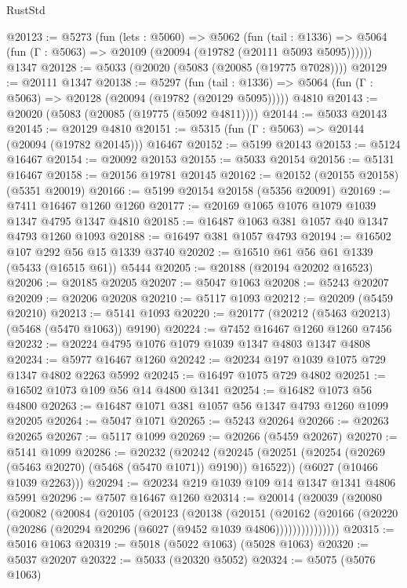 \begin{lexlean}{RustStd}
\begin{coremodule}
@20123 := @5273
    (fun (lets : @5060) =>
    @5062
      (fun (tail : @1336) =>
      @5064 (fun (Γ : @5063) => @20109 (@20094 (@19782 (@20111 @5093 @5095))))))
    @1347
@20128 := @5033 (@20020 (@5083 (@20085 (@19775 @7028))))
@20129 := @20111 @1347
@20138 := @5297
    (fun (tail : @1336) => @5064 (fun (Γ : @5063) => @20128 (@20094 (@19782 (@20129 @5095)))))
    @4810
@20143 := @20020 (@5083 (@20085 (@19775 (@5092 @4811))))
@20144 := @5033 @20143
@20145 := @20129 @4810
@20151 := @5315 (fun (Γ : @5063) => @20144 (@20094 (@19782 @20145))) @16467
@20152 := @5199 @20143
@20153 := @5124 @16467
@20154 := @20092 @20153
@20155 := @5033 @20154
@20156 := @5131 @16467
@20158 := @20156 @19781 @20145
@20162 := @20152 (@20155 @20158) (@5351 @20019)
@20166 := @5199 @20154 @20158 (@5356 @20091)
@20169 := @7411 @16467 @1260 @1260
@20177 := @20169 @1065 @1076 @1079 @1039 @1347 @4795 @1347 @4810
@20185 := @16487 @1063 @381 @1057 @40 @1347 @4793 @1260 @1093
@20188 := @16497 @381 @1057 @4793
@20194 := @16502 @107 @292 @56 @15 @1339 @3740
@20202 := @16510 @61 @56 @61 @1339 (@5433 (@16515 @61)) @5444
@20205 := @20188 (@20194 @20202 @16523)
@20206 := @20185 @20205
@20207 := @5047 @1063
@20208 := @5243 @20207
@20209 := @20206 @20208
@20210 := @5117 @1093
@20212 := @20209 (@5459 @20210)
@20213 := @5141 @1093
@20220 := @20177 (@20212 (@5463 @20213) (@5468 (@5470 @1063)) @9190)
@20224 := @7452 @16467 @1260 @1260 @7456
@20232 := @20224 @4795 @1076 @1079 @1039 @1347 @4803 @1347 @4808
@20234 := @5977 @16467 @1260
@20242 := @20234 @197 @1039 @1075 @729 @1347 @4802 @2263 @5992
@20245 := @16497 @1075 @729 @4802
@20251 := @16502 @1073 @109 @56 @14 @4800 @1341
@20254 := @16482 @1073 @56 @4800
@20263 := @16487 @1071 @381 @1057 @56 @1347 @4793 @1260 @1099 @20205
@20264 := @5047 @1071
@20265 := @5243 @20264
@20266 := @20263 @20265
@20267 := @5117 @1099
@20269 := @20266 (@5459 @20267)
@20270 := @5141 @1099
@20286 := @20232
    (@20242
      (@20245 (@20251 (@20254 (@20269 (@5463 @20270) (@5468 (@5470 @1071)) @9190)) @16522))
      (@6027 (@10466 @1039 @2263)))
@20294 := @20234 @219 @1039 @109 @14 @1347 @1341 @4806 @5991
@20296 := @7507 @16467 @1260
@20314 := @20014
    (@20039
      (@20080
        (@20082
          (@20084
            (@20105
              (@20123
                (@20138
                  (@20151
                    (@20162
                      (@20166
                        (@20220 (@20286 (@20294 @20296 (@6027 (@9452 @1039 @4806)))))))))))))))
@20315 := @5016 @1063
@20319 := @5018 (@5022 @1063) (@5028 @1063)
@20320 := @5037 @20207
@20322 := @5033 (@20320 @5052)
@20324 := @5075 (@5076 @1063)

\end{coremodule}
\end{lexlean}

